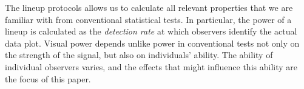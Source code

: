 \documentclass[10pt]{article}\usepackage[]{graphicx}\usepackage[]{color}
\newcommand{\hh}[1]{{\color{magenta} #1}}
\newcommand{\dc}[1]{{\color{green} #1}}
\newcommand{\mm}[1]{{\color{mahbub} #1}}
\begin{document}
 

The lineup protocols allows us to calculate all relevant properties that we are familiar with from conventional statistical tests. In particular, the power of a lineup is calculated as the {\it detection rate} at which observers identify the actual data plot. Visual power depends unlike power in conventional tests not only on the strength of the signal, but also on individuals' ability. 
The ability of individual observers varies, and the effects that might influence this ability are the focus of this paper.


\end{document}
